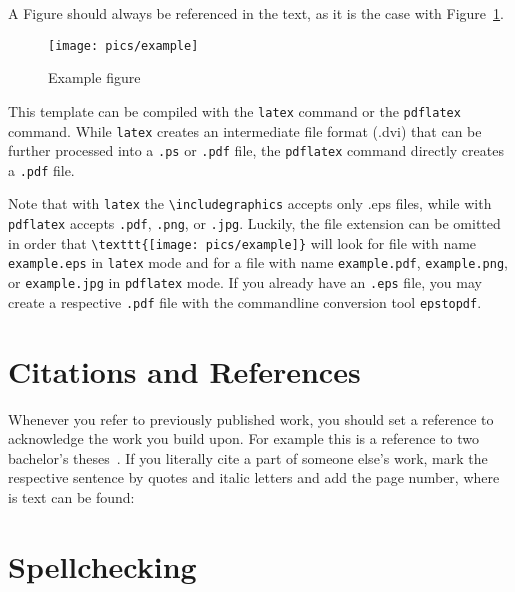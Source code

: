 A Figure should always be referenced in the text, as it is the case
with Figure~\ref{fig:example}.

\begin{figure}[ht]
 \centerline{\texttt{[image: pics/example]}}
  \caption{Example figure}
  \label{fig:example}
\end{figure}

This template can be compiled with the \texttt{latex} command or the
\texttt{pdflatex} command. While \texttt{latex} creates an
intermediate file format (.dvi) that can be further processed into a
\texttt{.ps} or \texttt{.pdf} file, the \texttt{pdflatex} command
directly creates a \texttt{.pdf} file.

Note that with \texttt{latex} the \verb+\includegraphics+ accepts
only .eps files, while with \texttt{pdflatex} accepts \texttt{.pdf},
\texttt{.png}, or \texttt{.jpg}. Luckily, the file extension can be
omitted in order that \verb+\texttt{[image: pics/example]}+ will
look for file with name \texttt{example.eps} in \texttt{latex} mode
and for a file with name \texttt{example.pdf}, \texttt{example.png},
or \texttt{example.jpg} in \texttt{pdflatex} mode. If you already
have an \texttt{.eps} file, you may create a respective
\texttt{.pdf} file with the commandline conversion tool
\texttt{epstopdf}.

\section{Citations and References}

Whenever you refer to previously published work, you should set a
reference to acknowledge the work you build upon. For example this
is a reference to two bachelor's theses~\cite{kraut:2003,
weirich:2005}. If you literally cite a part of someone else's work,
mark the respective sentence by quotes and italic letters and add
the page number, where is text can be found:

\cite[p.\,175]{elmenreich:2005}

\section{Spellchecking}

